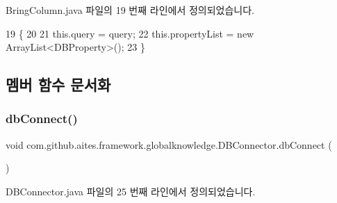 Bring\+Column.\+java 파일의 19 번째 라인에서 정의되었습니다.


\begin{DoxyCode}
19                                      \{
20         
21         this.query = query;
22         this.propertyList = \textcolor{keyword}{new} ArrayList<DBProperty>();
23     \}
\end{DoxyCode}


\subsection{멤버 함수 문서화}
\mbox{\label{classcom_1_1github_1_1aites_1_1framework_1_1globalknowledge_1_1_d_b_connector_a108808207e33b613b470855bb2be9223}} 
\subsubsection{\texorpdfstring{db\+Connect()}{dbConnect()}}
{\footnotesize\ttfamily void com.\+github.\+aites.\+framework.\+globalknowledge.\+D\+B\+Connector.\+db\+Connect (\begin{DoxyParamCaption}{ }\end{DoxyParamCaption})\hspace{0.3cm}{\ttfamily [inherited]}}



D\+B\+Connector.\+java 파일의 25 번째 라인에서 정의되었습니다.


